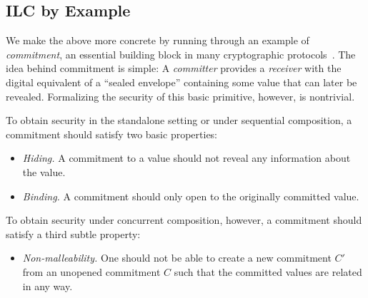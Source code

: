 \subsection{ILC by Example}
\label{subsec:ilc-flavored}

We make the above more concrete by running through an example of
\emph{commitment}, an essential building block in many cryptographic
protocols~\cite{brassard1988minimum}. The idea behind commitment is simple: A
\emph{committer} provides a \emph{receiver} with the digital equivalent of a
``sealed envelope'' containing some value that can later be
revealed. Formalizing the security of this basic primitive, however, is
nontrivial.

To obtain security in the standalone setting or under sequential composition, a
commitment should satisfy two basic properties:
\begin{itemize}[leftmargin=*]
\item \emph{Hiding.} A commitment to a value should not reveal any information
  about the value.
\item \emph{Binding.} A commitment should only open to the originally committed value.
\end{itemize}

\noindent To obtain security under concurrent composition, however, a commitment
should satisfy a third subtle property:
\begin{itemize}[leftmargin=*]
\item \emph{Non-malleability.} One should not be able to create a new commitment
  $C'$ from an unopened commitment $C$ such that the committed values are
  related in any way.
\end{itemize}

